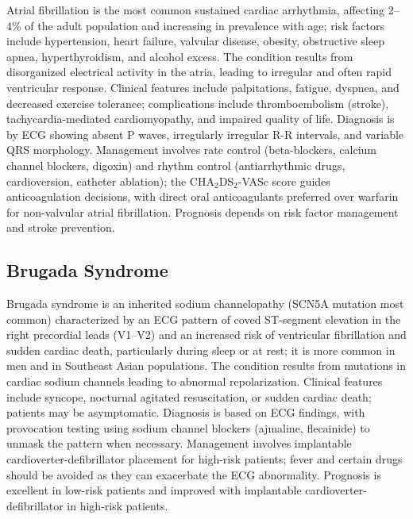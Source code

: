 Atrial fibrillation is the most common sustained cardiac arrhythmia, affecting 2--4\% of the adult population and increasing in prevalence with age; risk factors include hypertension, heart failure, valvular disease, obesity, obstructive sleep apnea, hyperthyroidism, and alcohol excess. The condition results from disorganized electrical activity in the atria, leading to irregular and often rapid ventricular response. Clinical features include palpitations, fatigue, dyspnea, and decreased exercise tolerance; complications include thromboembolism (stroke), tachycardia-mediated cardiomyopathy, and impaired quality of life. Diagnosis is by ECG showing absent P waves, irregularly irregular R-R intervals, and variable QRS morphology. Management involves rate control (beta-blockers, calcium channel blockers, digoxin) and rhythm control (antiarrhythmic drugs, cardioversion, catheter ablation); the CHA$_2$DS$_2$-VASc score guides anticoagulation decisions, with direct oral anticoagulants preferred over warfarin for non-valvular atrial fibrillation. Prognosis depends on risk factor management and stroke prevention.

\subsection{Brugada Syndrome}
\label{sec:Brugada Syndrome}
Brugada syndrome is an inherited sodium channelopathy (SCN5A mutation most common) characterized by an ECG pattern of coved ST-segment elevation in the right precordial leads (V1--V2) and an increased risk of ventricular fibrillation and sudden cardiac death, particularly during sleep or at rest; it is more common in men and in Southeast Asian populations. The condition results from mutations in cardiac sodium channels leading to abnormal repolarization. Clinical features include syncope, nocturnal agitated resuscitation, or sudden cardiac death; patients may be asymptomatic. Diagnosis is based on ECG findings, with provocation testing using sodium channel blockers (ajmaline, flecainide) to unmask the pattern when necessary. Management involves implantable cardioverter-defibrillator placement for high-risk patients; fever and certain drugs should be avoided as they can exacerbate the ECG abnormality. Prognosis is excellent in low-risk patients and improved with implantable cardioverter-defibrillator in high-risk patients.

